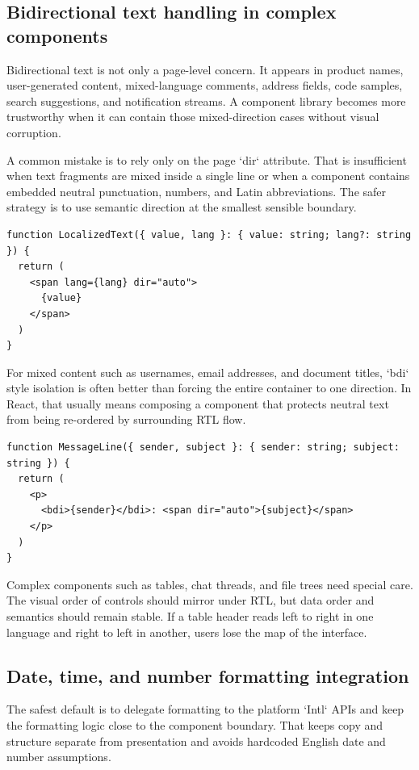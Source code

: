 \subsection{Bidirectional text handling in complex components}
Bidirectional text is not only a page-level concern. It appears in product names, user-generated content, mixed-language comments, address fields, code samples, search suggestions, and notification streams. A component library becomes more trustworthy when it can contain those mixed-direction cases without visual corruption.

A common mistake is to rely only on the page `dir` attribute. That is insufficient when text fragments are mixed inside a single line or when a component contains embedded neutral punctuation, numbers, and Latin abbreviations. The safer strategy is to use semantic direction at the smallest sensible boundary.

\begin{verbatim}
function LocalizedText({ value, lang }: { value: string; lang?: string }) {
  return (
    <span lang={lang} dir="auto">
      {value}
    </span>
  )
}
\end{verbatim}

For mixed content such as usernames, email addresses, and document titles, `bdi` style isolation is often better than forcing the entire container to one direction. In React, that usually means composing a component that protects neutral text from being re-ordered by surrounding RTL flow.

\begin{verbatim}
function MessageLine({ sender, subject }: { sender: string; subject: string }) {
  return (
    <p>
      <bdi>{sender}</bdi>: <span dir="auto">{subject}</span>
    </p>
  )
}
\end{verbatim}

Complex components such as tables, chat threads, and file trees need special care. The visual order of controls should mirror under RTL, but data order and semantics should remain stable. If a table header reads left to right in one language and right to left in another, users lose the map of the interface.

\subsection{Date, time, and number formatting integration}
The safest default is to delegate formatting to the platform `Intl` APIs and keep the formatting logic close to the component boundary. That keeps copy and structure separate from presentation and avoids hardcoded English date and number assumptions.

